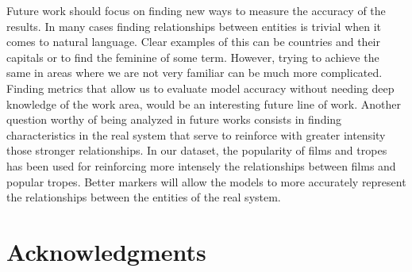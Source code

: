 \documentclass[letterpaper]{article}
\begin{document}
	Future work should focus on finding new ways to measure the accuracy of the results. In many cases finding relationships between entities is trivial when it comes to natural language. Clear examples of this can be countries and their capitals or to find the feminine of some term. However, trying to achieve the same in areas where we are not very familiar can be much more complicated. Finding metrics that allow us to evaluate model accuracy without needing deep knowledge of the work area, would be an interesting future line of work. Another question worthy of being analyzed in future works consists in finding characteristics in the real system that serve to reinforce with greater intensity those stronger relationships. In our dataset, the popularity of films and tropes has been used for reinforcing more intensely the relationships between films and popular tropes. Better markers will allow the models to more accurately represent the relationships between the entities of the real system.
	
	
	\section{Acknowledgments}
	
	
	
	
\end{document}
